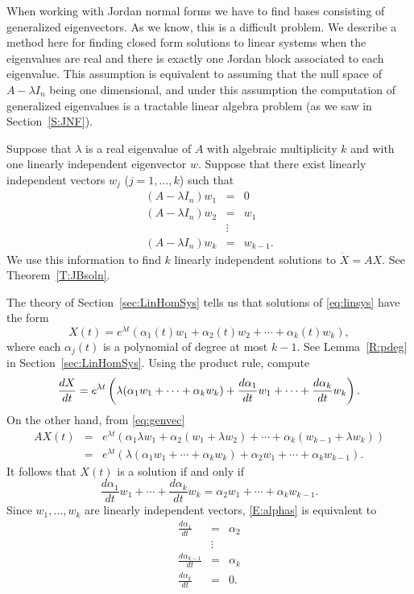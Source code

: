 \documentclass{ximera}
\begin{document}
When working with Jordan normal forms we have to 
find bases consisting of generalized eigenvectors.  As we know, this is a 
difficult problem.  We describe a method here for finding closed form 
solutions to linear systems when the eigenvalues are real and there is 
exactly one Jordan block associated to each eigenvalue.  
This assumption is equivalent to assuming that the null space of 
$A-\lambda I_n$ being one dimensional, and under this assumption the 
computation of generalized eigenvalues is a tractable linear algebra problem 
(as we saw in Section~\ref{S:JNF}).

Suppose that $\lambda$ is a real eigenvalue of $A$ with algebraic
multiplicity $k$ and with one linearly independent eigenvector $w$.   Suppose 
that there exist linearly independent vectors $w_j$ ($j=1,\ldots,k$) such that
\begin{equation}  \label{eq:genvec}
\begin{array}{rcl}
(A-\lambda I_n)w_1 & = & 0 \\
(A-\lambda I_n)w_2 & = & w_1 \\
& \vdots & \\
(A-\lambda I_n)w_k & = & w_{k-1}.
\end{array}
\end{equation}
We use this information to find $k$ linearly independent solutions to
$\dot{X}=AX$.  See Theorem~\ref{T:JBsoln}.

The theory of Section~\ref{sec:LinHomSys} tells us that solutions of
\eqref{eq:linsys} have the form
\[
X(t)=e^{\lambda t}(\alpha_1(t)w_1+\alpha_2(t)w_2+\cdots+\alpha_k(t)w_k),
\]
where each $\alpha_j(t)$ is a polynomial of degree at most $k-1$.  See 
Lemma~\ref{R:pdeg} in Section~\ref{sec:LinHomSys}.  Using the product rule, 
compute
\[
\displaystyle\frac{dX}{dt} = e^{\lambda t}
\left(\lambda (\alpha_1w_1+\cdots+\alpha_kw_k)+
\frac{d\alpha_1}{dt}w_1+\cdots+\frac{d\alpha_k}{dt}w_k\right).
\]
On the other hand, from \eqref{eq:genvec}
\begin{eqnarray*}
AX(t) & = & e^{\lambda t}(\alpha_1\lambda w_1+\alpha_2(w_1+\lambda w_2)
+\cdots+\alpha_k(w_{k-1}+\lambda w_k))\\
& = & e^{\lambda t}(\lambda (\alpha_1w_1+\cdots+\alpha_kw_k) +
\alpha_2w_1 + \cdots+ \alpha_kw_{k-1}).
\end{eqnarray*}
It follows that $X(t)$ is a solution if and only if
\begin{equation}  \label{E:alphas}
\frac{d\alpha_1}{dt}w_1+\cdots+
\frac{d\alpha_k}{dt}w_k= \alpha_2w_1 + \cdots+ \alpha_kw_{k-1}.
\end{equation}
Since $w_1,\ldots,w_k$ are linearly independent vectors, \eqref{E:alphas} is 
equivalent to
\begin{eqnarray*}
\frac{d\alpha_1}{dt} & = & \alpha_2    \\
                     & \vdots &        \\
\frac{d\alpha_{k-1}}{dt} & = & \alpha_k \\
\frac{d\alpha_k}{dt}  & = & 0.
\end{eqnarray*}
\end{document}
